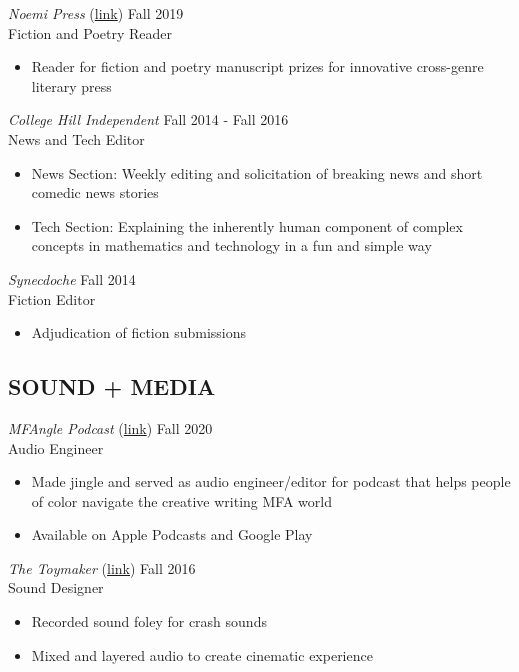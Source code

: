   \emph{Noemi Press}  (\href{https://www.noemipress.org/}{link}) \hfill Fall 2019 \\
Fiction and Poetry Reader \\
 \begin{itemize}
 \item Reader for fiction and poetry manuscript prizes for innovative cross-genre literary press
 \end{itemize}
 
 \emph{College Hill Independent}  \hfill Fall 2014 - Fall 2016 \\
News and Tech Editor \\
 \begin{itemize}
 \item News Section: Weekly editing and solicitation of breaking news and short comedic news stories
 \item Tech Section: Explaining the inherently human component of complex concepts in mathematics and technology in a fun and simple way
 \end{itemize}

\emph{Synecdoche}  \hfill Fall 2014 \\
Fiction Editor \\
 \begin{itemize}
 \item Adjudication of fiction submissions 
 \end{itemize}
 
\subsection{SOUND + MEDIA}
 
\emph{MFAngle Podcast} (\href{https://sites.google.com/vt.edu/mfanglepodcast/home}{link}) \hfill Fall 2020 \\
Audio Engineer  \\
\begin{itemize}
\item Made jingle and served as audio engineer/editor for podcast that helps people of color navigate the creative writing MFA world
\item Available on Apple Podcasts and Google Play
\end{itemize}

 
 \emph{The Toymaker} (\href{https://vimeo.com/242488116}{link}) \hfill
Fall 2016 \\
Sound Designer  \\
 \begin{itemize}
 \item Recorded sound foley for crash sounds
 \item Mixed and layered audio to create cinematic experience
 \end{itemize}

